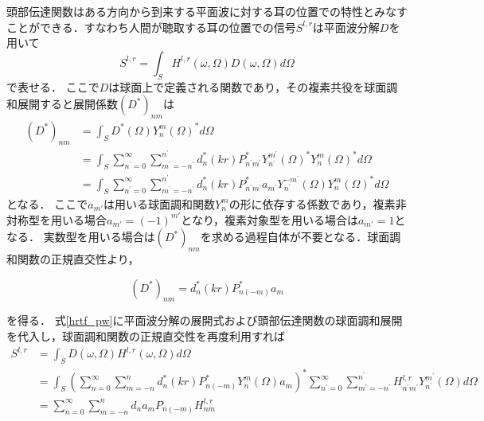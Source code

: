 \documentclass[a4paper]{jsarticle}
\begin{document}
頭部伝達関数はある方向から到来する平面波に対する耳の位置での特性とみなすことができる．すなわち人間が聴取する耳の位置での信号$S^{l, r}$は平面波分解$D$を用いて
\begin{equation}
    \label{hrtf_pw}
    S^{l, r}=\int_{S} H^{l, r}(\omega, \Omega) D(\omega, \Omega) d \Omega
\end{equation}
で表せる．
ここで$D$は球面上で定義される関数であり，その複素共役を球面調和展開すると展開係数$(D^*)_{nm}$は
$$
    \begin{aligned}
        \left(D^{*}\right)_{n m} & =\int_{S} D^{*}(\Omega) Y_{n}^{m}(\Omega)^{*} d \Omega                                                                                                                                                            \\
                                 & =\int_{S} \sum_{n^{\prime}=0}^{\infty} \sum_{m^{\prime}=-n^{\prime}}^{n^{\prime}} d_{n}^{*}(k r) P_{n^{\prime} m^{\prime}}^{*} Y_{n^{\prime}}^{m^{\prime}}(\Omega)^{*} Y_{n}^{m}(\Omega)^{*} d \Omega             \\
                                 & =\int_{S} \sum_{n^{\prime}=0}^{\infty} \sum_{m^{\prime}=-n^{\prime}}^{n^{\prime}} d_{n}^{*}(k r) P_{n^{\prime} m^{\prime}}^{*} a_{m^{\prime}} Y_{n^{\prime}}^{-m^{\prime}}(\Omega) Y_{n}^{m}(\Omega)^{*} d \Omega
    \end{aligned}
$$
となる．
ここで$a_{m'}$は用いる球面調和関数$Y_{n}^m$の形に依存する係数であり，複素非対称型を用いる場合$a_{m'} = (-1)^{m'}$となり，複素対象型を用いる場合は$a_{m'}=1$となる．
実数型を用いる場合は$(D^*)_{nm}$を求める過程自体が不要となる．球面調和関数の正規直交性より，

$$
    \left(D^{*}\right)_{n m}=d_{n}^{*}(k r) P_{n(-m)}^{*} a_{m}
$$

を得る．
式\ref{hrtf_pw}に平面波分解の展開式および頭部伝達関数の球面調和展開を代入し，球面調和関数の正規直交性を再度利用すれば
\begin{equation}
    \begin{aligned}
        \label{binaural_signal}
        S^{l, r} & =\int_{S} D(\omega, \Omega)H^{l, r}(\omega, \Omega)  d \Omega                                                                                                                                                                                                           \\
                 & =\int_{S}\left(\sum_{n=0}^{\infty} \sum_{m=-n}^{n} d_{n}^{*}(k r) P_{n(-m)}^{*} Y_{n}^{m}(\Omega) a_{m}\right)^{*} \sum_{n^{\prime}=0}^{\infty} \sum_{m^{\prime}=-n^{\prime}}^{n^{\prime}} H_{n^{\prime} m^{\prime}}^{l,r} Y_{n^{\prime}}^{m^{\prime}}(\Omega) d \Omega \\
                 & =\sum_{n=0}^{\infty} \sum_{m=-n}^{n} d_{n} a_{m} P_{n(-m)} H_{n m}^{l,r}
    \end{aligned}
\end{equation}
\end{document}
